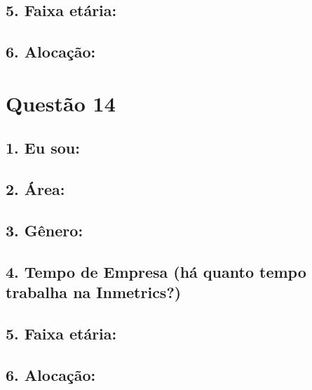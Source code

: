 \documentclass[]{book}
\begin{document}
\hypertarget{faixa-etaria-10}{%
\subsection{5. Faixa etária:}\label{faixa-etaria-10}}

\hypertarget{alocacao-10}{%
\subsection{6. Alocação:}\label{alocacao-10}}

\hypertarget{questao-14}{%
\section{Questão 14}\label{questao-14}}

\hypertarget{eu-sou-11}{%
\subsection{1. Eu sou:}\label{eu-sou-11}}

\hypertarget{area-11}{%
\subsection{2. Área:}\label{area-11}}

\hypertarget{genero-11}{%
\subsection{3. Gênero:}\label{genero-11}}

\hypertarget{tempo-de-empresa-ha-quanto-tempo-trabalha-na-inmetrics-11}{%
\subsection{4. Tempo de Empresa (há quanto tempo trabalha na Inmetrics?)}\label{tempo-de-empresa-ha-quanto-tempo-trabalha-na-inmetrics-11}}

\hypertarget{faixa-etaria-11}{%
\subsection{5. Faixa etária:}\label{faixa-etaria-11}}

\hypertarget{alocacao-11}{%
\subsection{6. Alocação:}\label{alocacao-11}}
\end{document}

